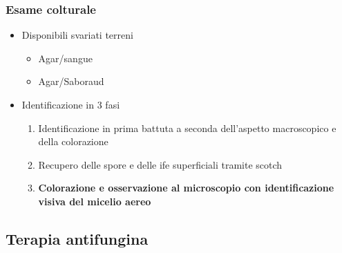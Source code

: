 \documentclass[italian,]{article}
\providecommand{\tightlist}{%
  \setlength{\itemsep}{0pt}\setlength{\parskip}{0pt}}
\begin{document}
\hypertarget{esame-colturale-1}{%
\subsubsection{Esame colturale}\label{esame-colturale-1}}

\begin{itemize}
\tightlist
\item
  Disponibili svariati terreni

  \begin{itemize}
  \tightlist
  \item
    Agar/sangue
  \item
    Agar/Saboraud
  \end{itemize}
\item
  Identificazione in 3 fasi

  \begin{enumerate}
  \def\labelenumi{\arabic{enumi}.}
  \tightlist
  \item
    Identificazione in prima battuta a seconda dell'aspetto macroscopico
    e della colorazione
  \item
    Recupero delle spore e delle ife superficiali tramite scotch
  \item
    \textbf{Colorazione e osservazione al microscopio con
    identificazione visiva del micelio aereo}
  \end{enumerate}
\end{itemize}

\hypertarget{terapia-antifungina}{%
\subsection{Terapia antifungina}\label{terapia-antifungina}}
\end{document}

